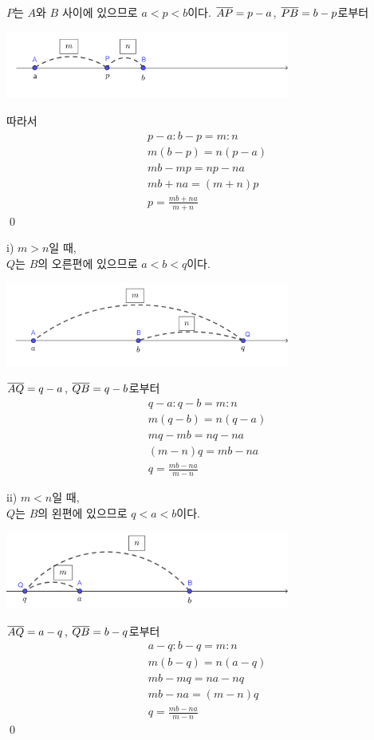 \documentclass{oblivoir}
\begin{document}
\proo
\bigskip\noindent{}\par
\(P\)는 \(A\)와 \(B\) 사이에 있으므로 \(a<p<b\)이다.
\(\overline{AP}=p-a\), \(\overline{PB}=b-p\)로부터
\begin{center}
\includegraphics[width=0.7\textwidth]{int_07}
\end{center}
따라서
\begin{gather*}
p-a:b-p=m:n\\
m(b-p)=n(p-a)\\
mb-mp=np-na\\
mb+na=(m+n)p\\
p=\frac{mb+na}{m+n}
\end{gather*}
\qed

\clearpage
\bigskip\noindent{}\par
i) \(m>n\)일 때,\\
\(Q\)는 \(B\)의 오른편에 있으므로 \(a<b<q\)이다.
\begin{center}
\includegraphics[width=0.7\textwidth]{int_08}
\end{center}
\(\overline{AQ}=q-a\), \(\overline{QB}=q-b\)로부터
\begin{gather*}
q-a:q-b=m:n\\
m(q-b)=n(q-a)\\
mq-mb=nq-na\\
(m-n)q=mb-na\\
q=\frac{mb-na}{m-n}
\end{gather*}

ii) \(m<n\)일 때,\\
\(Q\)는 \(B\)의 왼편에 있으므로 \(q<a<b\)이다.
\begin{center}
\includegraphics[width=0.7\textwidth]{int_09}
\end{center}
\(\overline{AQ}=a-q\), \(\overline{QB}=b-q\)로부터
\begin{gather*}
a-q:b-q=m:n\\
m(b-q)=n(a-q)\\
mb-mq=na-nq\\
mb-na=(m-n)q\\
q=\frac{mb-na}{m-n}
\end{gather*}
\qed
\end{document}
